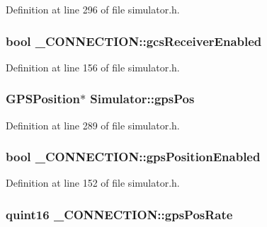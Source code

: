 Definition at line 296 of file simulator.\-h.

\hypertarget{group___h_i_t_l_plugin_ga2e4de2a270dafeeadda687a7fc6fb817}{
\subsubsection[{gcs\-Receiver\-Enabled}]{\setlength{\rightskip}{0pt plus 5cm}bool \-\_\-\-C\-O\-N\-N\-E\-C\-T\-I\-O\-N\-::gcs\-Receiver\-Enabled}}\label{group___h_i_t_l_plugin_ga2e4de2a270dafeeadda687a7fc6fb817}


Definition at line 156 of file simulator.\-h.

\hypertarget{group___h_i_t_l_plugin_gae4d6ea654494f0de351686d9c35037ca}{
\subsubsection[{gps\-Pos}]{\setlength{\rightskip}{0pt plus 5cm}G\-P\-S\-Position$\ast$ Simulator\-::gps\-Pos\hspace{0.3cm}{\ttfamily [protected]}}}\label{group___h_i_t_l_plugin_gae4d6ea654494f0de351686d9c35037ca}


Definition at line 289 of file simulator.\-h.

\hypertarget{group___h_i_t_l_plugin_gaec1f5b5cc3ce18186907fde4c9c990b3}{
\subsubsection[{gps\-Position\-Enabled}]{\setlength{\rightskip}{0pt plus 5cm}bool \-\_\-\-C\-O\-N\-N\-E\-C\-T\-I\-O\-N\-::gps\-Position\-Enabled}}\label{group___h_i_t_l_plugin_gaec1f5b5cc3ce18186907fde4c9c990b3}


Definition at line 152 of file simulator.\-h.

\hypertarget{group___h_i_t_l_plugin_ga2904afd635e416ec6fca4b3b6bb8679f}{
\subsubsection[{gps\-Pos\-Rate}]{\setlength{\rightskip}{0pt plus 5cm}quint16 \-\_\-\-C\-O\-N\-N\-E\-C\-T\-I\-O\-N\-::gps\-Pos\-Rate}}\label{group___h_i_t_l_plugin_ga2904afd635e416ec6fca4b3b6bb8679f}


